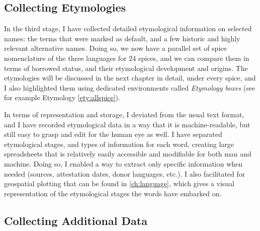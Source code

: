\subsection{Collecting Etymologies}
\label{sec:collecting_etymologies}

In the third stage, I have collected detailed etymological information on selected names: the terms that were marked as default, and a few historic and highly relevant alternative names. Doing so, we now have a parallel set of spice nomenclature of the three languages for 24 spices, and we can compare them in terms of borrowed status, and their etymological development and origins. The etymologies will be discussed in the next chapter in detail, under every spice, and I also highlighted them using dedicated environments called \textit{Etymology boxes} (see for example Etymology \ref{ety:allspice}).

In terms of representation and storage, I deviated from the usual text format, and I have recorded etymological data in a way that it is machine-readable, but still easy to grasp and edit for the human eye as well. I have separated etymological stages, and types of information for each word, creating large spreadsheets that is relatively easily accessible and modifiable for both man and machine. Doing so, I enabled a way to extract only specific information when needed (sources, attestation dates, donor languages, etc.). I also facilitated for geospatial plotting that can be found in \cref{ch:language}, which gives a visual representation of the etymological stages the words have embarked on.



\subsection{Collecting Additional Data}

